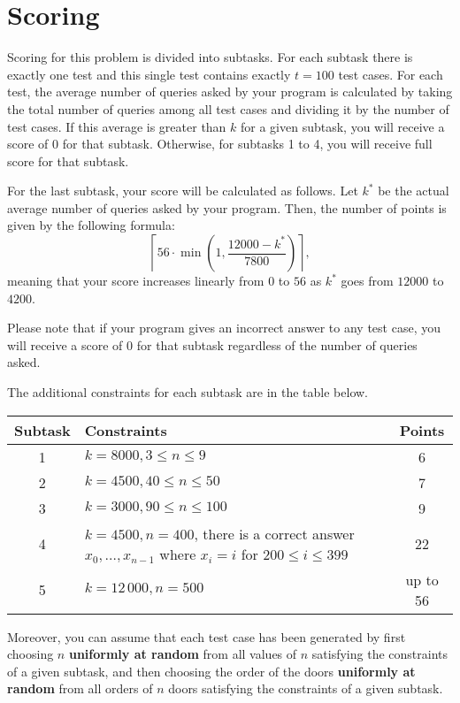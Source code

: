 \section*{Scoring}

Scoring for this problem is divided into subtasks. For each subtask there is exactly one test
and this single test contains exactly $t=100$ test cases.
For each test, the average number of queries asked by your program is calculated by taking the total number of queries
among all test cases and dividing it by the number of test cases. If this average is greater than $k$ for a given subtask,
you will receive a score of $0$ for that subtask. Otherwise, for subtasks 1 to 4, you will receive full score for that subtask.

For the last subtask, your score will be calculated as follows.
Let $k^{*}$ be the actual average number of queries asked by your program. Then, the
number of points is given by the following formula:
\[
\left\lceil 56 \cdot \min\left(1, \frac{12000-k^{*}}{7800}\right)\right\rceil,
\]
meaning that your score increases linearly from $0$ to $56$ as $k^{*}$ goes from $12000$ to $4200$.

Please note that if your program gives an incorrect answer to any test case, you will receive a score
of $0$ for that subtask
regardless of the number of queries asked.

The additional constraints for each subtask are in the table below.

\begin{center}
\begin{tabular}{|c|p{13cm}|c|}
\hline
\textbf{Subtask} & \textbf{Constraints} & \textbf{Points} \\ \hline
1 & $k=8000, 3\leq n\leq 9$ & 6 \\ \hline
2 & $k=4500, 40\leq n\leq 50$ & 7 \\ \hline
3 & $k=3000, 90\leq n\leq 100$ & 9 \\ \hline
4 & $k=4500, n=400$, there is a correct answer $x_0,\dots,x_{n-1}$ where $x_i=i$ for $200\leq i\leq 399$ & 22 \\ \hline
5 & $k=12\,000, n=500$ & up to 56 \\ \hline
\end{tabular}
\end{center}

Moreover, you can assume that each test case has been generated by first choosing
$n$ \textbf{uniformly at random} from all values of $n$ satisfying the constraints of a given subtask,
and then choosing the order of the doors \textbf{uniformly at random} from all orders
of $n$ doors satisfying the constraints of a given subtask.
